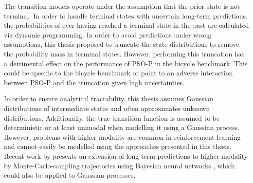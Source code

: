The transition models operate under the assumption that the prior state is not terminal.
In order to handle terminal states with uncertain long-term predictions, the probabilities of ever having reached a terminal state in the past are calculated via dynamic programming.
In order to avoid predictions under wrong assumptions, this thesis proposed to truncate the state distributions to remove the probability mass in terminal states.
However, performing this truncation has a detrimental effect on the performance of PSO-P in the bicycle benchmark.
This could be specific to the bicycle benchmark or point to an adverse interaction between PSO-P and the truncation given high uncertainties.

In order to ensure analytical tractability, this thesis assumes Gaussian distributions of intermediate states and often approximates unknown distributions.
Additionally, the true transition function is assumed to be deterministic or at least unimodal when modelling it using a Gaussian process.
However, problems with higher modality are common in reinforcement learning and cannot easily be modelled using the approaches presented in this thesis.
Recent work by \citeauthor{depeweg_learning_2016} presents an extension of long-term predictions to higher modality by Monte-Carlo-sampling trajectories using Bayesian neural networks \cite{depeweg_learning_2016}, which could also be applied to Gaussian processes.
